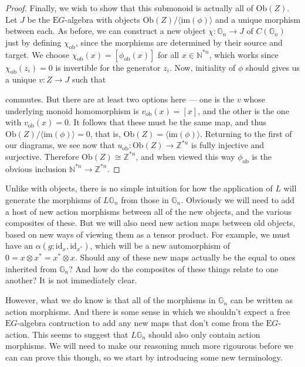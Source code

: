 \documentclass{amsart} %
\newenvironment{eq*}{\begin{equation*}}{\end{equation*}}
\begin{document}
\begin{proof}
Finally, we wish to show that this submonoid is actually all of  $\mathrm{Ob}(Z)$. Let $J$ be the $\mathrm{E}G$-algebra with objects $\mathrm{Ob}(Z) / \langle \mathrm{im}(\phi) \rangle$ and a unique morphism between each. As before, we can construct a new object $\chi : \mathbb{G}_n \to J$ of $C(\mathbb{G}_n)$ just by defining $\chi_{\mathrm{ob}}$, since the morphisms are determined by their source and target. We choose $\chi_{\mathrm{ob}}(x) = [\phi_{\mathrm{ob}}(x)]$ for all $x \in \mathbb{N}^{*n}$, which works since $\chi_{\mathrm{ob}}(z_i) = 0$ is invertible for the generator $z_i$. Now, initiality of $\phi$ should gives us a unique $v : Z \to J$ such that 
\begin{eq*} 
\end{eq*}
commutes. But there are at least two options here --- one is the $v$ whose underlying monoid homomorphism is $v_{\mathrm{ob}}(x) = [x]$, and the other is the one with $v_{\mathrm{ob}}(x) = 0$. It follows that these must be the same map, and thus $ \mathrm{Ob}(Z) / \langle \mathrm{im}(\phi) \rangle = 0$, that is, $\mathrm{Ob}(Z) =  \langle \mathrm{im}(\phi) \rangle$. Returning to the first of our diagrams, we see now that $u_{\mathrm{ob}} : \mathrm{Ob}(Z) \to \mathbb{Z}^{*n}$ is fully injective and surjective. Therefore $ \mathrm{Ob}(Z) \cong \mathbb{Z}^{*n}$, and when viewed this way $\phi_{\mathrm{ob}}$ is the obvious inclusion $\mathbb{N}^{*n} \to \mathbb{Z}^{*n}$.
\end{proof}

Unlike with objects, there is no simple intuition for how the application of $L$ will generate the morphisms of $L\mathbb{G}_n$ from those in $\mathbb{G}_n$. Obviously we will need to add a host of new action morphisms between all of the new objects, and the various composites of these. But we will also need new action maps between old objects, based on new ways of viewing them as a tensor product. For example, we must have an $\alpha(g; \mathrm{id}_x, \mathrm{id}_{x^*})$, which will be a new automorphism of $0 = x \otimes x^* = x^* \otimes x$. Should any of these new maps actually be the equal to ones inherited from $\mathbb{G}_n$? And how do the composites of these things relate to one another? It is not immediately clear. 

However, what we do know is that all of the morphisms in $\mathbb{G}_n$ can be written as action morphisms. And there is some sense in which we shouldn't expect a free $\mathrm{E}G$-algebra contruction to add any new maps that don't come from the $\mathrm{E}G$-action. This seems to suggest that $L\mathbb{G}_n$ should also only contain action morphisms. We will need to make our reasoning much more rigourous before we can can prove this though, so we start by introducing some new terminology.
\end{document}
